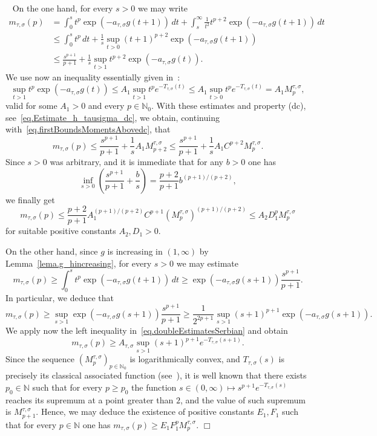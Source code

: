 \documentclass[12pt,leqno]{amsart}
\def\N{\mathbb{N}}
\theoremstyle{plain}
\theoremstyle{definition}
\numberwithin{equation}{section}
\newenvironment{proof1}{\medskip\par\noindent{\bf Proof}\ \normalfont}{\hfill $\Box$
\medskip\par}
\begin{document}
\begin{proof1}
On the one hand, for every $s>0$ we may write
\begin{align}
m_{\tau,\sigma}(p)&=\int_0^s t^p\exp\left(-a_{\tau,\sigma}g(t+1)\right)\,dt
+\int_s^\infty \frac{1}{t^2}t^{p+2}\exp\left(-a_{\tau,\sigma}g(t+1)\right)\,dt\nonumber\\
&\le \int_0^s t^p\,dt
+\frac{1}{s}\sup_{t>0}(t+1)^{p+2}\exp\left(-a_{\tau,\sigma}g(t+1)\right)\nonumber\\
&\le \frac{s^{p+1}}{p+1}+ \frac{1}{s}\sup_{t>1}t^{p+2}\exp\left(-a_{\tau,\sigma}g(t)\right). \label{eq.firstBoundsMomentsAbovedc}
\end{align}
We use now an inequality essentially given in~\cite[$(2.3)$]{ptt}:
\begin{equation*}%
\sup_{t>1}t^{p}\exp\left(-a_{\tau,\sigma}g(t)\right)
\le A_{1}\sup_{t>1}t^pe^{-T_{\tau,\sigma}(t)}\le A_1\sup_{t>0}t^pe^{-T_{\tau,\sigma}(t)}= A_1M_p^{\tau,\sigma},
\end{equation*}
valid for some $A_1>0$ and every $p\in\N_0$.
With these estimates and property (dc), see~\eqref{eq.Estimate_h_tausigma_dc}, we obtain, continuing with~\eqref{eq.firstBoundsMomentsAbovedc}, that
$$m_{\tau,\sigma}(p)\le \frac{s^{p+1}}{p+1}+ \frac{1}{s}A_1M_{p+2}^{\tau,\sigma}\le \frac{s^{p+1}}{p+1}+ \frac{1}{s}A_1C^{p+2}M_{p}^{\tau,\sigma}.$$
Since $s>0$ was arbitrary, and it is immediate that for any $b>0$ one has
$$
\inf_{s>0}\left(\frac{s^{p+1}}{p+1}+\frac{b}{s}\right)= \frac{p+2}{p+1}b^{(p+1)/(p+2)},
$$
we finally get
$$m_{\tau,\sigma}(p)\le \frac{p+2}{p+1}A_1^{(p+1)/(p+2)} C^{p+1}(M_{p}^{\tau,\sigma})^{(p+1)/(p+2)}\le A_2D_1^{p}M_{p}^{\tau,\sigma}$$
for suitable positive constants $A_2,D_1>0$.

On the other hand, since $g$ is increasing in $(1,\infty)$ by Lemma~\ref{lema.g_hincreasing}, for every $s>0$ we may estimate
$$
m_{\tau,\sigma}(p)\ge \int_0^s t^p\exp\left(-a_{\tau,\sigma}g(t+1)\right)\,dt\ge
\exp\left(-a_{\tau,\sigma}g(s+1)\right)\frac{s^{p+1}}{p+1}.
$$
In particular, we deduce that
$$m_{\tau,\sigma}(p)\ge\sup_{s>1}\exp\left(-a_{\tau,\sigma}g(s+1)\right) \frac{s^{p+1}}{p+1}\ge \frac{1}{2^{2p+1}}\sup_{s>1}(s+1)^{p+1} \exp\left(-a_{\tau,\sigma}g(s+1)\right).$$
We apply now the left inequality in~\eqref{eq.doubleEstimatesSerbian} and obtain
$$
m_{\tau,\sigma}(p)\ge A_{\tau,\sigma}\sup_{s>1}(s+1)^{p+1}e^{-T_{\tau,\sigma}(s+1)}.
$$
Since the sequence $(M_p^{\tau,\sigma})_{p\in\N_0}$ is logarithmically convex, and  $T_{\tau,\sigma}(s)$ is precisely its classical associated function (see~\cite{komatsu}), it is well known that there exists $p_0\in\mathbb{N}$ such that for every $p\ge p_0$ the function $s\in(0,\infty)\mapsto s^{p+1}e^{-T_{\tau,\sigma}(s)}$ reaches its supremum at a point greater than $2$, and the value of such supremum is $M_{p+1}^{\tau,\sigma}$.
Hence, we may deduce the existence of positive constants $E_1,F_1$ such that for every $p\in\mathbb{N}$ one has $m_{\tau,\sigma}(p)\ge E_1F_1^{p}M_{p}^{\tau,\sigma}$.
\end{proof1}
\end{document}
